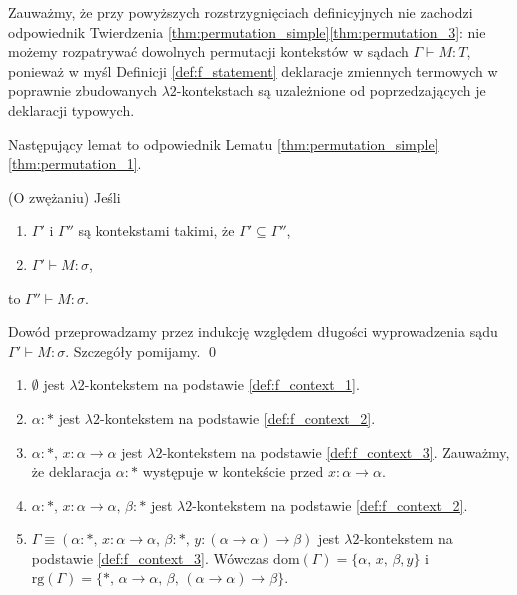  \begin{uwaga*}
   Zauważmy, że przy powyższych rozstrzygnięciach definicyjnych nie zachodzi odpowiednik Twierdzenia \ref{thm:permutation_simple}\ref{thm:permutation_3}: nie możemy rozpatrywać dowolnych permutacji kontekstów w sądach \(\Gamma\vdash M:T\), ponieważ w myśl Definicji \ref{def:f_statement} deklaracje zmiennych termowych w poprawnie zbudowanych \(\lambda 2\)-kontekstach są uzależnione od poprzedzających je deklaracji typowych. 

\end{uwaga*}

Następujący lemat to odpowiednik Lematu \ref{thm:permutation_simple} \ref{thm:permutation_1}.
\begin{lemat}(O zwężaniu)\label{thm:thinning_f}
      Jeśli \begin{enumerate}[label=(\alph*), ref=(\alph*)]
        \setlength\itemsep{0em}
        \item \(\Gamma'\) i \(\Gamma''\) są kontekstami takimi, że \(\Gamma' \subseteq \Gamma''\),
        \item \(\Gamma'\vdash M:\sigma\),
      \end{enumerate}
      to \(\Gamma''\vdash M:\sigma\).
\end{lemat}
\begin{dowod}
  Dowód przeprowadzamy przez indukcję względem długości wyprowadzenia sądu \(\Gamma'\vdash M:\sigma\). Szczegóły pomijamy.
  \qed
\end{dowod}

\begin{przyklad}
  \begin{enumerate}[label=(\alph*), ref=(\alph*)]
    \setlength\itemsep{0em}
    \item \(\emptyset\) jest  \(\lambda 2\)-kontekstem na podstawie
      \ref{def:f_context_1}.\label{ex:f_context_a}
    \item \(\alpha:*\)  jest \(\lambda 2\)-kontekstem  na podstawie
\ref{def:f_context_2}.\label{ex:f_context_b}

    \item           \(\alpha:*,\,x:\alpha\to\alpha\)           jest
\(\lambda 2\)-kontekstem      na      podstawie      
\ref{def:f_context_3}.     Zauważmy,     że
deklaracja    \(\alpha:*\)    występuje   w    kontekście    przed
\(x:\alpha\to\alpha\).\label{ex:f_context_c}

    \item \(\alpha:*,\,x:\alpha\to\alpha,\,\beta:*\) jest \(\lambda 2\)-kontekstem na podstawie \ref{def:f_context_2}.\label{ex:f_context_d}

    \item \(\Gamma\equiv(\alpha:*,\,x:\alpha\to\alpha,\,\beta:*,\,y:(\alpha\to\alpha)\to\beta)\) jest \(\lambda 2\)-kontekstem na podstawie \ref{def:f_context_3}. Wówczas \(\mathrm{dom}(\Gamma)=\{\alpha,\,x,\,\beta,y\}\) i \(\mathrm{rg}(\Gamma)=\{*,\,\alpha\to\alpha,\, \beta,\,(\alpha\to\alpha)\to\beta\}\).\label{ex:f_context_e}
  \end{enumerate}
\end{przyklad}

